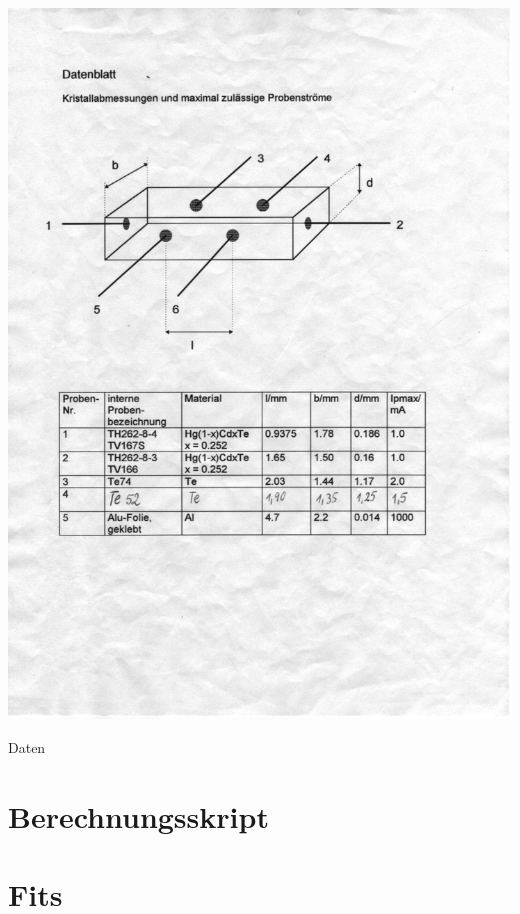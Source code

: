 \begin{table}[htb!]
 \centering
 \includegraphics[viewport=55 200 500 390,clip]{../docs/scan_datenblatt}
 \caption{Daten}
 \label{tab:daten}
\end{table}

\newpage


\section{Berechnungsskript}



\section{Fits}
\label{sec:fits}

